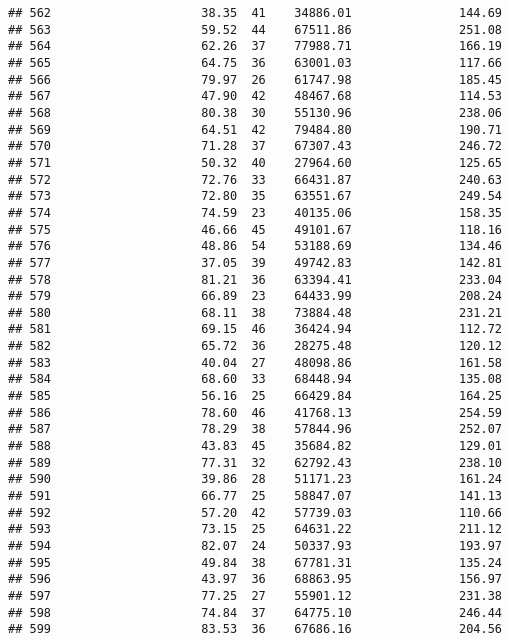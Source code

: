 \documentclass[
]{article}
\begin{document}
\begin{verbatim}
## 562                     38.35  41    34886.01               144.69
## 563                     59.52  44    67511.86               251.08
## 564                     62.26  37    77988.71               166.19
## 565                     64.75  36    63001.03               117.66
## 566                     79.97  26    61747.98               185.45
## 567                     47.90  42    48467.68               114.53
## 568                     80.38  30    55130.96               238.06
## 569                     64.51  42    79484.80               190.71
## 570                     71.28  37    67307.43               246.72
## 571                     50.32  40    27964.60               125.65
## 572                     72.76  33    66431.87               240.63
## 573                     72.80  35    63551.67               249.54
## 574                     74.59  23    40135.06               158.35
## 575                     46.66  45    49101.67               118.16
## 576                     48.86  54    53188.69               134.46
## 577                     37.05  39    49742.83               142.81
## 578                     81.21  36    63394.41               233.04
## 579                     66.89  23    64433.99               208.24
## 580                     68.11  38    73884.48               231.21
## 581                     69.15  46    36424.94               112.72
## 582                     65.72  36    28275.48               120.12
## 583                     40.04  27    48098.86               161.58
## 584                     68.60  33    68448.94               135.08
## 585                     56.16  25    66429.84               164.25
## 586                     78.60  46    41768.13               254.59
## 587                     78.29  38    57844.96               252.07
## 588                     43.83  45    35684.82               129.01
## 589                     77.31  32    62792.43               238.10
## 590                     39.86  28    51171.23               161.24
## 591                     66.77  25    58847.07               141.13
## 592                     57.20  42    57739.03               110.66
## 593                     73.15  25    64631.22               211.12
## 594                     82.07  24    50337.93               193.97
## 595                     49.84  38    67781.31               135.24
## 596                     43.97  36    68863.95               156.97
## 597                     77.25  27    55901.12               231.38
## 598                     74.84  37    64775.10               246.44
## 599                     83.53  36    67686.16               204.56

\end{verbatim}
\end{document}
